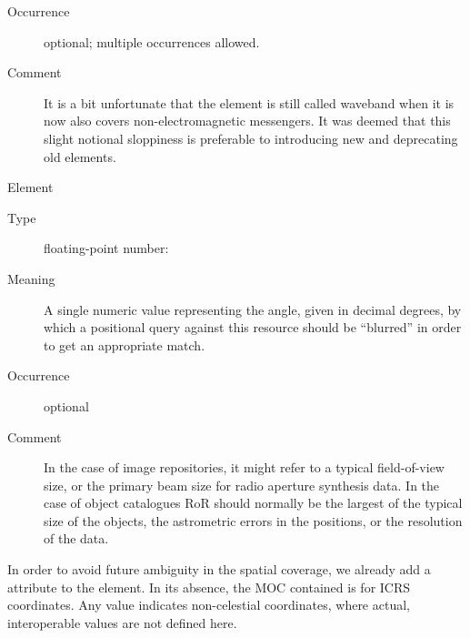 \documentclass[11pt,a4paper]{ivoa}
\begin{document}
\begin{generated}
\begin{bigdescription}
\begin{description}
\item[Occurrence] optional; multiple occurrences allowed.
\item[Comment]
                  It is a bit unfortunate that the element is still called
                  waveband when it is now also covers non-electromagnetic
                  messengers.  It was deemed that this slight notional
                  sloppiness is preferable to introducing new and
                  deprecating old elements.


\end{description}
\item[Element \xmlel{regionOfRegard}]
\begin{description}
\item[Type] floating-point number: 
\item[Meaning]
                  A single numeric value representing the angle, given
                  in decimal degrees, by which a positional query
                  against this resource should be “blurred” in order
                  to get an appropriate match.

\item[Occurrence] optional
\item[Comment]
                  In the case of image repositories, it might refer to
                  a typical field-of-view size, or the primary beam
                  size for radio aperture synthesis data.  In the case
                  of object catalogues RoR should normally be the
                  largest of the typical size of the objects, the
                  astrometric errors in the positions, or the
                  resolution of the data.


\end{description}


\end{bigdescription}\endgroup

\endgroup
\end{generated}


In order to avoid future ambiguity in the spatial coverage, we already
add a  attribute to the  element.  In its
absence, the MOC contained is for ICRS coordinates.  Any value indicates
non-celestial coordinates, where actual, interoperable values are not
defined here.
\end{document}
